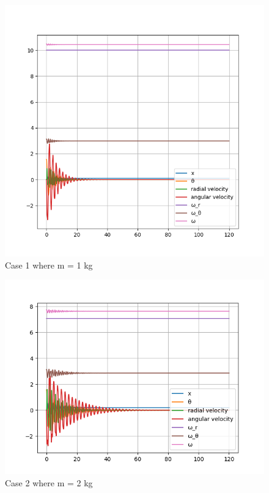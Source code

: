 \begin{figure}[H]
    \centering
    \includegraphics[width=15cm]{SimPictures/m1.png}
    \caption{{Case 1 where m = 1 kg}}
    \label{}
\end{figure}
        
\begin{figure}[H]
    \centering
    \includegraphics[width=15cm]{SimPictures/m2.png}
    \caption{{Case 2 where m = 2 kg}}
    \label{}
\end{figure}
        
